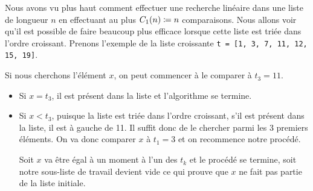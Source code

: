 \documentclass{magnolia}
\begin{document}
Nous avons vu plus haut comment effectuer une recherche linéaire dans une liste de longueur $n$ en
effectuant au plus $C_1(n)\coloneqq n$ comparaisons. Nous allons voir qu'il est possible de faire beaucoup plus efficace
lorsque cette liste est triée dans l'ordre croissant. Prenons l'exemple de la liste croissante
\verb!t = [1, 3, 7, 11, 12, 15, 19]!.
\begin{center}
\end{center}
Si nous cherchons l'élément $x$, on peut commencer à le comparer à $t_3=11$.
\begin{itemize}
\item Si $x=t_3$, il est présent dans la liste et l'algorithme se termine.
\item Si $x<t_3$, puisque la liste est triée dans l'ordre croissant, s'il est présent dans
  la liste, il est à gauche de 11. Il suffit donc de le chercher parmi les 3 premiers éléments.
  On va donc comparer $x$ à $t_1=3$ et on recommence notre procédé.
  \begin{center}
    \end{center}
  Soit $x$ va être égal à un moment à l'un des $t_k$ et le procédé se termine, soit notre sous-liste
  de travail devient vide ce qui prouve que $x$ ne fait pas partie de la liste initiale.
\end{itemize}
\end{document}
